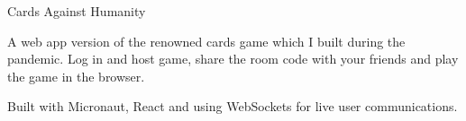 \cventry
    {Cards Against Humanity}
    {} %
    {} %
    {} %
    {\begin{cvitems}
        \item{A web app version of the renowned cards game which I built during the pandemic. Log in and host game, share
        the room code with your friends and play the game in the browser.}
        \item{Built with Micronaut, React and using WebSockets for live user communications.}
    \end{cvitems}}